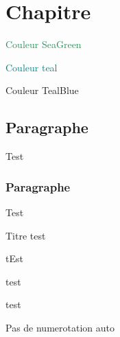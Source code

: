 \documentclass[12pt, twoside, openright, french]{book}
\begin{document}

\renewcommand\CouleurChapitre{Orange}
\renewcommand\CouleurDefi{Bleu}
\renewcommand\CouleurProp{Rouge}
\renewcommand\CouleurThm{Rouge}
\renewcommand\CouleurDemo{CadetBlue}
\renewcommand\CouleurExemple{teal}
\renewcommand\CouleurSolExemple{lightgray}
\renewcommand\CouleurExemple{darkgray}
\renewcommand\CouleurTitreBoiteCrayon{black}


\chapter{Chapitre }



\textcolor{SeaGreen}{Couleur SeaGreen}

\textcolor{teal}{Couleur teal}

\textcolor{TealBlue}{Couleur TealBlue}

\section{Paragraphe}
\begin{Defi}{}
Test
\end{Defi}

\subsection{Paragraphe}
\begin{Thm}[]{}
Test
\end{Thm}

\begin{Prop}[s]{Titre}
test
\end{Prop}

\begin{Demo}[~titre]
tEst
\end{Demo}

\begin{Exemple}[blabla]
test
\end{Exemple}

\begin{SolExemple}[blabla]

test
\end{SolExemple}

\begin{Exemple*}[~A]
Pas de numerotation auto
\end{Exemple*}
\end{document}
